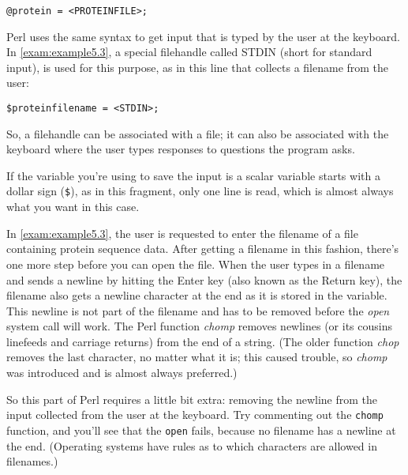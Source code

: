 \begin{lstlisting}
@protein = <PROTEINFILE>;
\end{lstlisting}

Perl uses the same syntax to get input that is typed by the user at the keyboard. In \autoref{exam:example5.3}, a special filehandle called STDIN (short for standard input), is used for this purpose, as in this line that collects a filename from the user:

\begin{lstlisting}
$proteinfilename = <STDIN>;
\end{lstlisting}

So, a filehandle can be associated with a file; it can also be associated with the keyboard where the user types responses to questions the program asks.

If the variable you're using to save the input is a scalar variable starts with a dollar sign (\verb|$|), as in this fragment, only one line is read, which is almost always what you want in this case.

In \autoref{exam:example5.3}, the user is requested to enter the filename of a file containing protein sequence data. After getting a filename in this fashion, there's one more step before you can open the file. When the user types in a filename and sends a newline by hitting the Enter key (also known as the Return key), the filename also gets a newline character at the end as it is stored in the variable. This newline is not part of the filename and has to be removed before the \textit{open} system call will work. The Perl function \textit{chomp} removes newlines (or its cousins linefeeds and carriage returns) from the end of a string. (The older function \textit{chop} removes the last character, no matter what it is; this caused trouble, so \textit{chomp} was introduced and is almost always preferred.)

So this part of Perl requires a little bit extra: removing the newline from the input collected from the user at the keyboard. Try commenting out the \verb|chomp| function, and you'll see that the \verb|open| fails, because no filename has a newline at the end. (Operating systems have rules as to which characters are allowed in filenames.) 

